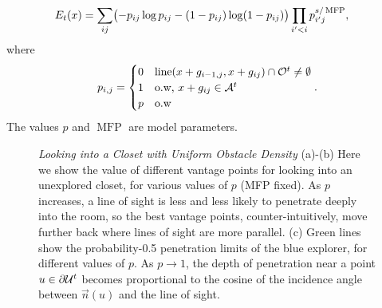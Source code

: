 \begin{align}
E_t(x)&=\sum_{ij} \bigl(-p_{ij}\log p_{ij} - (1-p_{ij})\log (1-p_{ij})\bigr) \prod_{i^{\prime}<i} p_{i^{\prime}j}^{s/\operatorname{MFP}},
\end{align}
where
$$p_{i,j} = \begin{cases}
0 & \operatorname{line}(x+g_{i-1,j}, x+g_{ij}) \cap \mathcal{O}^t \neq \emptyset \\
1 & \text{o.w, } x+g_{ij}\in\mathcal{A}^t\\
p & \text{o.w}
\end{cases}.$$
The values $p$ and $\operatorname{MFP}$ are model parameters.

\def\n{\vec{n}}
\begin{figure}
\centering
{}
\caption{\emph{Looking into a Closet with Uniform Obstacle Density}
(a)-(b) Here we show the value of different vantage points
for looking into an unexplored closet, 
for various values of $p$ (MFP fixed).
As $p$ increases, a line of sight is less and less likely to 
penetrate deeply into the room, so the 
best vantage points, counter-intuitively, move further back where 
lines of sight are more parallel.
(c) Green lines show the probability-0.5 penetration limits of
the blue explorer, for different values of $p$.  
As $p\to 1$, the depth of penetration near a point $u\in\partial\mathcal{U}^t$ 
becomes proportional to the cosine of the incidence angle
between $\n(u)$ and the line of sight.
}
\end{figure}
